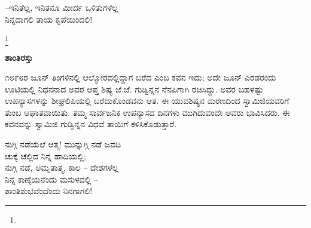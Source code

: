 \begin{myquote}
–ಇನಿತೆಲ್ಲ, ಇನಿತನೂ ಮೀರ್ದ ಒಳಿತುಗಳೆಲ್ಲ\\ನಿನ್ನದಾಗಲಿ ತಾಯ ಕೃಪೆಯಿಂದಲಿ!
\end{myquote}

\protect\footnote{}

\begin{myquote}
\end{myquote}

\begin{myquote}
\end{myquote}

\begin{myquote}
\end{myquote}

\begin{center}
\textbf{ಶಾಂತಿರಸ್ತು}
\end{center}

೧೮೯೮ರ ಜೂನ್ ತಿಂಗಳಿನಲ್ಲಿ ಆಲ್ಮೋರದಲ್ಲಿದ್ದಾಗ ಬರೆದ  ಎಂಬ ಕವನ ಇದು; ಅದೇ ಜೂನ್ ಎರಡರಂದು ಊಟಿಯಲ್ಲಿ ನಿಧನನಾದ ಅವರ ಆಪ್ತ ಶಿಷ್ಯ ಜೆ.ಜೆ. ಗುಡ್ವಿನ್ನನ ನೆನಪಿಗಾಗಿ ರಚಿಸಿದ್ದು. ಅವರ ಬಹಳಷ್ಟು ಉಪನ್ಯಾಸಗಳನ್ನು ಶೀಘ್ರಲಿಪಿಯಲ್ಲಿ ಬರೆದುಕೊಂಡವನು ಆತ. ಈ ಯುವಶಿಷ್ಯನ ಮರಣದಿಂದ ಸ್ವಾಮಿಜಿಯವರಿಗೆ ತುಂಬ ಆಘಾತವಾಯಿತು. ತಮ್ಮ ಸಾರ್ವಜನಿಕ ಉಪನ್ಯಾಸದ ದಿನಗಳು ಮುಗಿದುವಂದೇ ಅವರು ಭಾವಿಸಿದರು. ಈ ಕವನವನ್ನು ಸ್ವಾಮಿಜಿ ಗುಡ್ವಿನ್ನನ ವಿಧವೆ ತಾಯಿಗೆ ಕಳಿಸಿಕೊಡುತ್ತಾರೆ.

\begin{myquote}
ನುಗ್ಗಿ ನಡೆಯೆಲೆ ಆತ್ಮ! ಮುನ್ನುಗ್ಗಿ ನಡೆ ಜವದಿ\\ಚುಕ್ಕೆ ಚೆಲ್ಲಿದ ನಿನ್ನ ಹಾದಿಯಲ್ಲಿ;\\ನುಗ್ಗಿ ನಡೆ, ಅಮೃತಾತ್ಮ, ಕಾಲ – ದೇಶಗಳೆಲ್ಲ\\ನಿನ್ನ ಕಾಣ್ಕೆಯನೆಂದು ಮಸುಳದಲ್ಲಿ –\\ಶಾಂತಿಶುಭವೆಂದೆಂದು ನಿನಗಾಗಲಿ!
\end{myquote}

